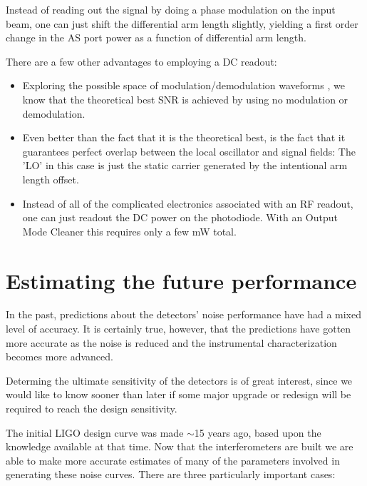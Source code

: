 Instead of reading out the signal by doing a phase modulation on the
input beam, one can just shift the differential arm length slightly,
yielding a first order change in the AS port power as a function of
differential arm length.

There are a few other advantages to employing a DC readout:

\begin{itemize}
\item Exploring the possible space of modulation/demodulation waveforms
      \cite{Meers:modulation}, we know that the theoretical best SNR
      is achieved by using no modulation or demodulation. 

\item Even better than the fact that it is the theoretical best, is the
      fact that it guarantees perfect overlap between the local oscillator
      and signal fields: The 'LO' in this case is just the static
      carrier generated by the intentional arm length offset.

\item Instead of all of the complicated electronics associated with an
      RF readout, one can just readout the DC power on the photodiode.
      With an Output Mode Cleaner this requires only a few mW total.
\end{itemize}




\section{Estimating the future performance}

In the past, predictions about the detectors' noise performance have had a mixed
level of accuracy. It is certainly true, however, that the predictions have gotten 
more accurate as the noise is reduced and the instrumental characterization becomes
more advanced.

Determing the ultimate sensitivity of the detectors is of great interest, since
we would like to know sooner than later if some major upgrade or redesign will
be required to reach the design sensitivity.

The initial LIGO design curve was made $\sim$15 years ago, based upon the
knowledge available at that time. Now that the interferometers are built we
are able to make more accurate estimates of many of the parameters involved
in generating these noise curves. There are three particularly important cases:

